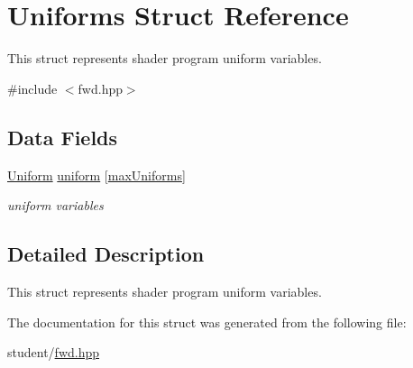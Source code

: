 \hypertarget{structUniforms}{}\section{Uniforms Struct Reference}
\label{structUniforms}


This struct represents shader program uniform variables.  




{\ttfamily \#include $<$fwd.\+hpp$>$}

\subsection*{Data Fields}
\begin{DoxyCompactItemize}
\item 
\mbox{\label{structUniforms_ac1130b74094bf1d7eaa9e18b332deff9}} 
\hyperlink{unionUniform}{Uniform} \hyperlink{structUniforms_ac1130b74094bf1d7eaa9e18b332deff9}{uniform} \mbox{[}\hyperlink{fwd_8hpp_abb316cce98ea6938a7112c5f932d673f}{max\+Uniforms}\mbox{]}
\begin{DoxyCompactList}\small\item\em uniform variables \end{DoxyCompactList}\end{DoxyCompactItemize}


\subsection{Detailed Description}
This struct represents shader program uniform variables. 

The documentation for this struct was generated from the following file\+:\begin{DoxyCompactItemize}
\item 
student/\hyperlink{fwd_8hpp}{fwd.\+hpp}\end{DoxyCompactItemize}
